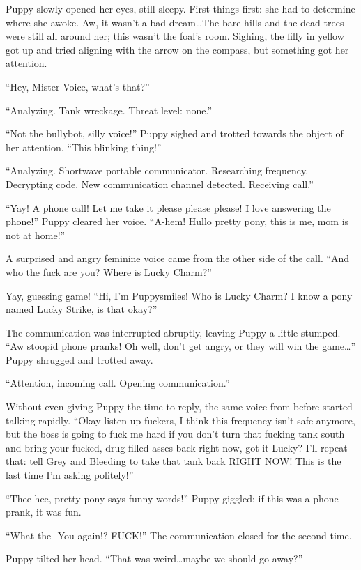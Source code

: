 Puppy slowly opened her eyes, still sleepy. First things first: she had to determine where she awoke. Aw, it wasn't a bad dream\dots The bare hills and the dead trees were still all around her; this wasn't the foal's room. Sighing, the filly in yellow got up and tried aligning with the arrow on the compass, but something got her attention.

``Hey, Mister Voice, what's that?''

``{\mt Analyzing. Tank wreckage. Threat level: none.}''

``Not the bullybot, silly voice!'' Puppy sighed and trotted towards the object of her attention. ``This blinking thing!''

``{\mt Analyzing. Shortwave portable communicator. Researching frequency. Decrypting code. New communication channel detected. Receiving call.}''

``Yay! A phone call! Let me take it please please please! I love answering the phone!'' Puppy cleared her voice. ``A-hem! Hullo pretty pony, this is me, mom is not at home!''

A surprised and angry feminine voice came from the other side of the call. ``And who the fuck are you? Where is Lucky Charm?''

Yay, guessing game! ``Hi, I'm Puppysmiles! Who is Lucky Charm? I know a pony named Lucky Strike, is that okay?''

The communication was interrupted abruptly, leaving Puppy a little stumped. ``Aw stoopid phone pranks! Oh well, don't get angry, or they will win the game\dots'' Puppy shrugged and trotted away.

``{\mt Attention, incoming call. Opening communication.}''

Without even giving Puppy the time to reply, the same voice from before started talking rapidly. ``Okay listen up fuckers, I think this frequency isn't safe anymore, but the boss is going to fuck me hard if you don't turn that fucking tank south and bring your fucked, drug filled asses back right now, got it Lucky? I'll repeat that: tell Grey and Bleeding to take that tank back RIGHT NOW! This is the last time I'm asking politely!''

``Thee-hee, pretty pony says funny words!'' Puppy giggled; if this was a phone prank, it was fun.

``What the- You again!? FUCK!'' The communication closed for the second time.

Puppy tilted her head. ``That was weird\dots maybe we should go away?''

